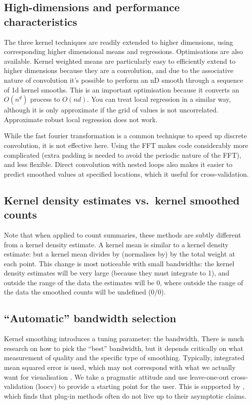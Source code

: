 \documentclass[journal]{vgtc}                %
\begin{document}
\subsection{High-dimensions and performance characteristics}

The three kernel techniques are readily extended to higher dimensions, using corresponding higher dimensional means and regressions. Optimisations are also available. Kernel weighted means are particularly easy to efficiently extend to higher dimensions  because they are a convolution, and due to the associative nature of convolution it's possible to perform an nD smooth through a sequence of 1d kernel smooths. This is an important optimisation because it converts an $O(n^d)$ process to $O(nd)$.  You can treat local regression in a similar way, although it is only approximate if the grid of values is not uncorrelated. Approximate robust local regression does not work.

While the fast fourier transformation is a common technique to speed up discrete convolution, it is not effective here.  Using the FFT makes code considerably more complicated (extra padding is needed to avoid the periodic nature of the FFT), and less flexible. Direct convolution with nested loops also makes it easier to predict smoothed values at specified locations, which it useful for cross-validation.

\subsection{Kernel density estimates vs.\ kernel smoothed counts}

Note that when applied to count summaries, these methods are subtly different from a kernel density estimate. A kernel mean is similar to a kernel density estimate: but a kernel mean divides by (normalises by) by the total weight at each point. This change is most noticeable with small bandwidths: the kernel density estimates will be very large (because they must integrate to 1), and outside the range of the data the estimates will be 0, where outside the range of the data the smoothed counts will be undefined (0/0).

\subsection{``Automatic'' bandwidth selection}

Kernel smoothing introduces a tuning parameter: the bandwidth. There is much research on how to pick the ``best'' bandwidth, but it depends critically on what measurement of quality and the specific type of smoothing. Typically, integrated mean squared error is used, which may not correspond with what we actually want for visualisation \citep{denby:2009}. We take a pragmatic attitude and use leave-one-out cross-validation (loocv) \citep{efron:1983} to provide a starting point for the user. This is supported by \citep{loader:1999}, which finds that plug-in methods often do not live up to their asymptotic claims.
\end{document}
